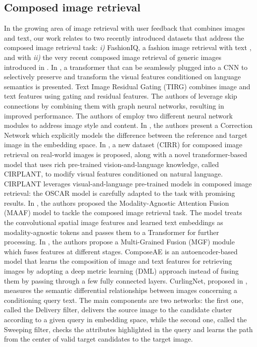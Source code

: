 \documentclass[acmlarge]{acmart}
\begin{document}
\subsection*{Composed image retrieval}
In the growing area of image retrieval with user feedback that combines images and text, our work relates to two recently introduced datasets that address the composed image retrieval task: \textit{i)} FashionIQ, a fashion image retrieval with text \cite{wu2021fashion}, and with \textit{ii)} the very recent composed image retrieval of generic images introduced in \cite{liu2021image}. In \cite{Chen_2020_CVPR}, a transformer that can be seamlessly plugged into a CNN to selectively preserve and transform the visual features conditioned on language semantics is presented. Text Image Residual Gating (TIRG) \cite{vo2019composing} combines image and text features using gating and residual features. The authors of \cite{shin2021rtic} leverage skip connections by combining them with graph neural networks, resulting in improved performance. The authors of \cite{Lee_2021_CVPR} employ two different neural network modules to address image style and content.
In \cite{Kim_Yu_Kim_Kim_2021}, the authors present a Correction Network which explicitly models the difference between the reference and target image in the embedding space.  
In \cite{liu2021image}, a new dataset (CIRR) for composed image retrieval on real-world images is proposed, along with a novel transformer-based model that uses rich pre-trained vision-and-language knowledge, called CIRPLANT, to modify visual features conditioned on natural language. CIRPLANT leverages visual-and-language pre-trained models in composed image retrieval: the OSCAR model \cite{li2020oscar} is carefully adapted to the task with promising results.
In \cite{dodds2020modality}, the authors proposed the Modality-Agnostic Attention Fusion (MAAF) model to tackle the composed image retrieval task. The model treats the convolutional spatial image features and learned text embeddings as modality-agnostic tokens and passes them to a Transformer for further processing.
In \cite{Liu-2021-multigrained}, the authors propose a Multi-Grained Fusion (MGF) module which fuses features at different stages.
ComposeAE \cite{Anwaar_2021_WACV} is an autoencoder-based model that learns the composition of image and text features for retrieving images by adopting a deep metric learning (DML) approach instead of fusing them by passing through a few fully connected layers.
CurlingNet, proposed in \cite{yu2020curlingnet}, measures the semantic differential relationships between images concerning a conditioning query text. The main components are two networks: the first one, called the Delivery filter, delivers the source image to the candidate cluster according to a given query in embedding space, while the second one, called the Sweeping filter, checks the attributes highlighted in the query and learns the path from the center of valid target candidates to the target image. 
\end{document}
